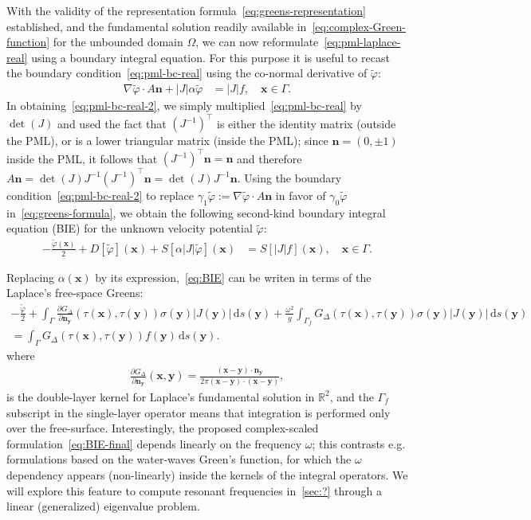 \documentclass[11pt]{article}
\newcommand{\R}{\mathbb{R}}
\newcommand{\bn}{\mathbf{n}}
\newcommand{\bx}{\mathbf{x}}
\newcommand{\by}{\mathbf{y}}
\newcommand{\de}{\,\mathrm{d}}
\newcommand{\tvarphi}{\tilde \varphi}
\begin{document}
With the validity of the representation formula~\cref{eq:greens-representation}
established, and the fundamental solution readily available
in~\cref{eq:complex-Green-function} for the unbounded domain $\Omega$, we can
now reformulate~\cref{eq:pml-laplace-real} using a boundary integral equation.
For this purpose it is useful to recast the boundary
condition~\cref{eq:pml-bc-real} using the co-normal derivative of $\tvarphi$:
\begin{align}
  \label{eq:pml-bc-real-2}
  \nabla \tvarphi \cdot A\bn +|J| \alpha \tvarphi &= |J| f, \quad \bx \in \Gamma.
\end{align}
In obtaining~\cref{eq:pml-bc-real-2}, we simply multiplied~\cref{eq:pml-bc-real}
by $\det(J)$ and used the fact that $(J^{-1})^\top$ is either the identity
matrix (outside the PML), or is a lower triangular matrix (inside the PML);
since $\bn = (0,\pm 1)$ inside the PML, it follows that $(J^{-1})^\top \bn =
\bn$ and therefore $A \bn = \det(J) J^{-1} (J^{-1})^\top \bn = \det(J)J^{-1}
\bn$. Using the boundary condition~\cref{eq:pml-bc-real-2} to replace
$\gamma_1\tvarphi := \nabla \tvarphi \cdot A \bn$ in favor of $\gamma_0
\tvarphi$ in~\cref{eq:greens-formula}, we obtain the following second-kind
boundary integral equation (BIE) for the unknown velocity potential $\tvarphi$:
\begin{align}
  \label{eq:BIE}
  -\frac{\tvarphi(\bx)}{2} + D[\tvarphi](\bx) + S\left[\alpha\left|J\right|\tvarphi\right](\bx) &= S[|J|f](\bx), \quad \bx \in \Gamma.
\end{align}

Replacing $\alpha(\bx)$ by its expression,~\cref{eq:BIE} can be writen in terms of the Laplace's free-space Greens:
\begin{align}
  \label{eq:BIE-final}  
  -\frac{\tvarphi}{2} + \int_\Gamma \frac{\partial G_{\Delta}}{\partial \bn_\by}(\tau(\bx),\tau(\by)) \sigma(\by) |J(\by)| \de s(\by) + \frac{\omega^2}{g}\int_{\Gamma_f} G_{\Delta}(\tau(\bx),\tau(\by)) \sigma(\by) |J(\by)|\de s(\by) \\
  = \int_{\Gamma} G_{\Delta}(\tau(\bx),\tau(\by)) f(\by) \de s(\by). \nonumber
\end{align}
where 
\begin{align}
\label{eq:double-layer-kernel}  
\frac{\partial G_{\Delta}}{\partial\bn_{\by}}(\bx,\by) = \frac{(\bx-\by) \cdot \bn_{\by}}{2\pi (\bx - \by) \cdot (\bx - \by)},
\end{align}  
is the double-layer kernel for Laplace's fundamental solution in $\R^2$, and the
$\Gamma_f$ subscript in the single-layer operator means that integration is
performed only over the free-surface. Interestingly, the proposed complex-scaled
formulation~\cref{eq:BIE-final} depends linearly on the frequency $\omega$; this
contrasts e.g. formulations based on the water-waves Green's function, for which
the $\omega$ dependency appears (non-linearly) inside the kernels of the
integral operators. We will explore this feature to compute resonant frequencies
in~\cref{sec:?} through a linear (generalized) eigenvalue problem.
\end{document}

